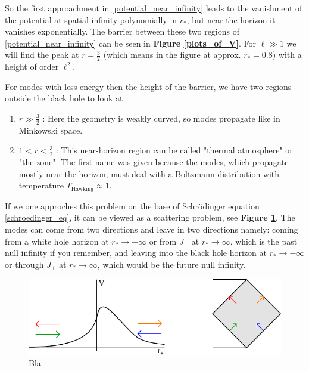 	So the first approachment in \eqref{potential_near_infinity} leads to the vanishment of the potential at spatial infinity polynomially in $r_*$, but near the horizon it vanishes exponentially.
	The barrier between these two regions of \eqref{potential_near_infinity} can be seen in \textbf{Figure \ref{plots_of_V}}. For $\ell \gg 1$ we will find the peak at $r = \frac{3}{2}$ (which means in the figure at approx. $r_*= 0.8$) with a height of order $\ell^2$.
	
	For modes with less energy then the height of the barrier, we have two regions outside the black hole to look at: 
	\begin{enumerate}[1.)]
		\item $r \gg \frac{3}{2}$ : Here the geometry is weakly curved, so modes propagate like in Minkowski space.
		\item $1 < r < \frac{3}{2}$ : This near-horizon region can be called "thermal atmosphere" or "the zone". The first name was given because the modes, which propagate mostly near the horizon, must deal with a Boltzmann distribution with temperature $T_{\text{Hawking}} \approx 1$.  
	\end{enumerate} 	
	If we one approches this problem on the base of Schrödinger equation \eqref{schroedinger_eq}, it can be viewed as a scattering problem, see \textbf{Figure \ref{scattering}}. The modes can come from two directions and leave in two directions namely: coming from a white hole horizon at $r_*\rightarrow -\infty$ or from $J_-$ at $r_*\rightarrow \infty$, which is the past null infinity if you remember, and leaving into the black hole horizon at $r_* \rightarrow -\infty$ or through $J_+$ at $r_* \rightarrow \infty$, which would be the future null infinity. 
	\begin{figure} [tbp]
		\begin{center}
			\includegraphics[scale=1.6]{schscat}
			\caption{Bla} \label{scattering}
		\end{center}
	\end{figure}
